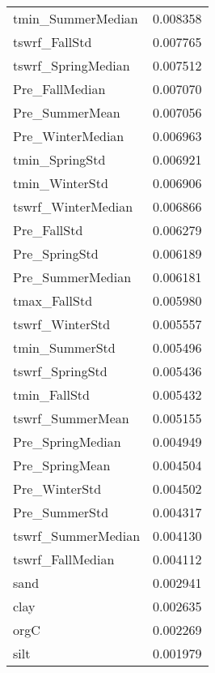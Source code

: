 \begin{tabular}{lr}
tmin_SummerMedian & 0.008358 \\
tswrf_FallStd & 0.007765 \\
tswrf_SpringMedian & 0.007512 \\
Pre_FallMedian & 0.007070 \\
Pre_SummerMean & 0.007056 \\
Pre_WinterMedian & 0.006963 \\
tmin_SpringStd & 0.006921 \\
tmin_WinterStd & 0.006906 \\
tswrf_WinterMedian & 0.006866 \\
Pre_FallStd & 0.006279 \\
Pre_SpringStd & 0.006189 \\
Pre_SummerMedian & 0.006181 \\
tmax_FallStd & 0.005980 \\
tswrf_WinterStd & 0.005557 \\
tmin_SummerStd & 0.005496 \\
tswrf_SpringStd & 0.005436 \\
tmin_FallStd & 0.005432 \\
tswrf_SummerMean & 0.005155 \\
Pre_SpringMedian & 0.004949 \\
Pre_SpringMean & 0.004504 \\
Pre_WinterStd & 0.004502 \\
Pre_SummerStd & 0.004317 \\
tswrf_SummerMedian & 0.004130 \\
tswrf_FallMedian & 0.004112 \\
sand & 0.002941 \\
clay & 0.002635 \\
orgC & 0.002269 \\
silt & 0.001979 \\
\bottomrule
\end{tabular}

